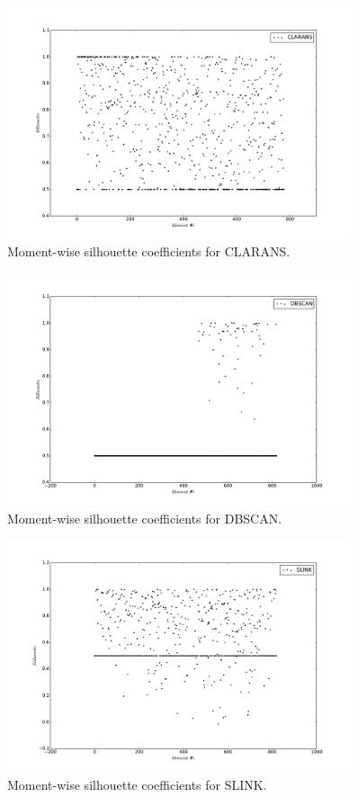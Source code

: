 \begin{figure}[ht]
    \centering
    \includegraphics[width=0.9\textwidth]{plots/clarans_silhouette.pdf}
    \caption{Moment-wise silhouette coefficients for CLARANS.
    \label{fig:clarans-silhouette} }
\end{figure}

\begin{figure}[ht]
    \centering
    \includegraphics[width=0.9\textwidth]{plots/dbscan_silhouette.pdf}
    \caption{Moment-wise silhouette coefficients for DBSCAN.
    \label{fig:dbscan-silhouette} }
\end{figure}

\begin{figure}[ht]
    \centering
    \includegraphics[width=0.9\textwidth]{plots/slink_silhouette.pdf}
    \caption{Moment-wise silhouette coefficients for SLINK.
    \label{fig:slink-silhouette} }
\end{figure}

